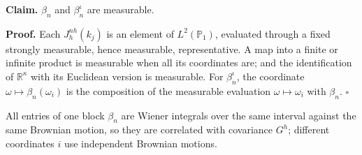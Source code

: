 \documentclass[11pt,a4paper]{article}
\begin{document}
\textbf{Claim.} \(\beta_n\) and \(\beta_n^\iota\) are measurable.




\textbf{Proof.} Each \(J^{nh}_h(k_j)\) is an element of \(L^2(\mathbb P_1)\), evaluated through a fixed strongly measurable, hence measurable, representative. A map into a finite or infinite product is measurable when all its coordinates are; and the identification of \(\mathbb R^\kappa\) with its Euclidean version is measurable. For \(\beta_n^\iota\), the coordinate \(\omega\mapsto\beta_n(\omega_i)\) is the composition of the measurable evaluation \(\omega\mapsto\omega_i\) with \(\beta_n\). \(\square\)




All entries of one block \(\beta_n\) are Wiener integrals over the same interval against the same Brownian motion, so they are correlated with covariance \(G^h\); different coordinates \(i\) use independent Brownian motions.
\end{document}

